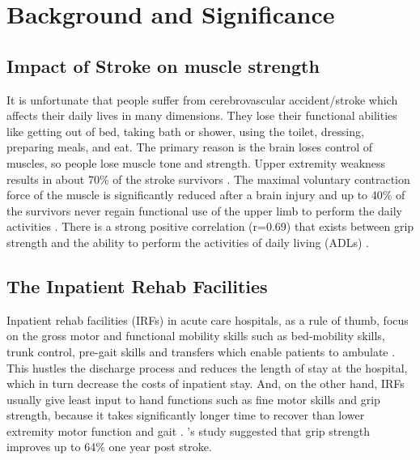 \documentclass[12pt]{article}
\begin{document}
\section {Background and Significance}
\subsection{Impact of Stroke on muscle strength}
It is unfortunate that people suffer from cerebrovascular accident/stroke which affects their daily lives in many dimensions. They lose their functional abilities like getting out of bed, taking bath or shower, using the toilet, dressing, preparing meals, and eat. The primary reason is the brain loses control of muscles, so people lose muscle tone and strength. Upper extremity weakness results in about 70\% of the stroke survivors \cite{rand2015predicting}. The maximal voluntary contraction force of the muscle  is significantly reduced after a brain injury and up to 40\% of the survivors never regain functional use of the upper limb to perform the daily activities \cite{harris2010strength}. There is a strong positive correlation (r=0.69) that exists between grip strength and the ability to perform the activities of daily living (ADLs) \cite{harris2007paretic}.  
\medskip

\subsection{The Inpatient Rehab Facilities}
Inpatient rehab facilities (IRFs) in acute care hospitals, as a rule of thumb, focus on the gross motor and  functional mobility skills such as bed-mobility skills, trunk control, pre-gait skills and transfers which enable patients to ambulate \cite{horn2005stroke}. This hustles the discharge process and reduces the length of stay at the hospital, which in turn decrease the costs of inpatient stay. And, on the other hand, IRFs usually give least input to hand functions such as fine motor skills  and grip strength, because it takes significantly longer time to recover than lower extremity motor function and gait \cite{lee2015six}. \citeauthor{rand2015predicting}'s study suggested that grip strength improves up to 64\% one year post stroke. 
\medskip
\end{document}
